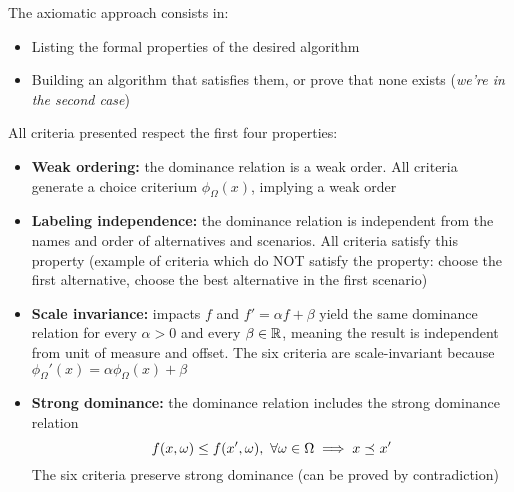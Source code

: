 The axiomatic approach consists in: 
\begin{itemize}
	\item Listing the formal properties of the desired algorithm
	
	\item Building an algorithm that satisfies them, or prove that none exists (\textit{we're in the second case})
\end{itemize}

All criteria presented respect the first four properties:
\begin{itemize}
	\item \textbf{Weak ordering:} the dominance relation is a weak order. All criteria generate a choice criterium $\phi_\Omega (x)$, implying a weak order
	
	\item \textbf{Labeling independence:} the dominance relation is independent from the names and order of alternatives and scenarios. All criteria satisfy this property (example of criteria which do NOT satisfy the property: choose the first alternative, choose the best alternative in the first scenario)
	
	\item \textbf{Scale invariance:} impacts $f$ and $f' = \alpha f + \beta$ yield the same dominance relation for every $\alpha > 0$ and every $\beta \in \operatorname{\mathbb{R}}$, meaning the result is independent from unit of measure and offset. The six criteria are scale-invariant because $\phi_\Omega'(x) = \alpha \phi_\Omega (x) + \beta$
	
	\item \textbf{Strong dominance:} the dominance relation includes the strong dominance relation
	$$ f(x, \omega) \leq f(x', \omega), \ \forall \omega \in \Omega \implies x \preceq_{} x'$$
	The six criteria preserve strong dominance (can be proved by contradiction)
\end{itemize}

